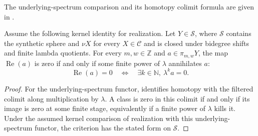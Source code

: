 \begin{theorem}
\label{sem:Literature:realization-kernel}
The underlying-spectrum comparison and its homotopy colimit formula
are given in \cite[Proposition 4.40, Remark 4.41 and
Propositions 5.6--5.7]{Pst}.\par

Assume the following kernel identity for realization.
Let $Y\in\mathcal S$, where $\mathcal S$ contains the synthetic sphere and
$\nu X$ for every $X\in\mathcal C$ and is closed under bidegree shifts
and finite lambda quotients. For every $m,w\in\mathbb Z$ and
$a\in\pi_{m,w}Y$, the map $\operatorname{Re}(a)$ is zero if and only if
some finite power of $\lambda$ annihilates $a$:
\[
\operatorname{Re}(a)=0\quad\Longleftrightarrow\quad
\exists k\in\mathbb N,\ \lambda^ka=0.
\]


\end{theorem}
\begin{proof}
For the underlying-spectrum functor, \cite[Remark 4.41]{Pst} identifies
homotopy with the filtered colimit along multiplication by $\lambda$.
A class is zero in this colimit if and only if its image is zero at
some finite stage, equivalently if a finite power of $\lambda$ kills it.
Under the assumed kernel comparison of realization with this
underlying-spectrum functor, the criterion has the stated form on
$\mathcal S$.
\end{proof}

